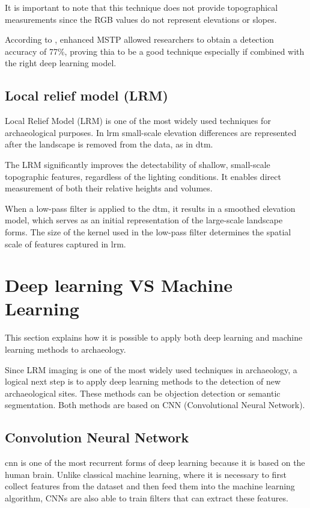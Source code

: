 It is important to note that this technique does not provide topographical measurements since the RGB values do not represent elevations or slopes.

According to \cite{emstp}, enhanced MSTP allowed researchers to obtain a detection accuracy of 77\%, proving thia to be a good technique especially if combined with the right deep learning model.

\subsection{Local relief model (LRM)}

Local Relief Model (LRM) is one of the most widely used techniques for archaeological purposes. In \ac{lrm} small-scale elevation differences are represented after the landscape is removed from the data, as in \ac{dtm}. 

The LRM significantly improves the detectability of shallow, small-scale topographic features, regardless of the lighting conditions. It enables direct measurement of both their relative heights and volumes\cite{lrm}.

When a low-pass filter is applied to the \ac{dtm}, it results in a smoothed elevation model, which serves as an initial representation of the large-scale landscape forms. The size of the kernel used in the low-pass filter determines the spatial scale of features captured in \ac{lrm}.

\section{Deep learning VS Machine Learning}

This section explains how it is possible to apply both deep learning and machine learning methods to archaeology.

Since LRM imaging is one of the most widely used techniques in archaeology, a logical next step is to apply deep learning methods to the detection of new archaeological sites. These methods can be objection detection or semantic segmentation. Both methods are based on CNN (Convolutional Neural Network).

\subsection{Convolution Neural Network }
\ac{cnn} is one of the most recurrent forms of deep learning because it is based on the human brain. Unlike classical machine learning, where it is necessary to first collect features from the dataset and then feed them into the machine learning algorithm, CNNs are also able to train filters that can extract these features.

